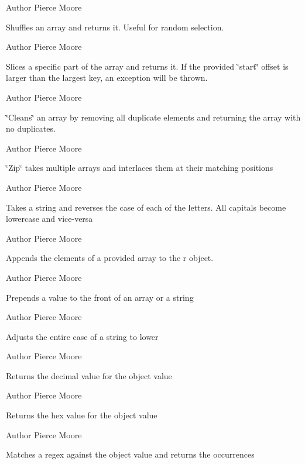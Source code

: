 \begin{DoxyAuthor}{Author}
Pierce Moore
\end{DoxyAuthor}
Shuffles an array and returns it. Useful for random selection.

\begin{DoxyAuthor}{Author}
Pierce Moore
\end{DoxyAuthor}
Slices a specific part of the array and returns it. If the provided \char`\"{}start\char`\"{} offset is larger than the largest key, an exception will be thrown.

\begin{DoxyAuthor}{Author}
Pierce Moore
\end{DoxyAuthor}
\char`\"{}\-Cleans\char`\"{} an array by removing all duplicate elements and returning the array with no duplicates.

\begin{DoxyAuthor}{Author}
Pierce Moore
\end{DoxyAuthor}
\char`\"{}\-Zip\char`\"{} takes multiple arrays and interlaces them at their matching positions

\begin{DoxyAuthor}{Author}
Pierce Moore
\end{DoxyAuthor}
Takes a string and reverses the case of each of the letters. All capitals become lowercase and vice-\/versa

\begin{DoxyAuthor}{Author}
Pierce Moore
\end{DoxyAuthor}
Appends the elements of a provided array to the r object.

\begin{DoxyAuthor}{Author}
Pierce Moore
\end{DoxyAuthor}
Prepends a value to the front of an array or a string

\begin{DoxyAuthor}{Author}
Pierce Moore
\end{DoxyAuthor}
Adjusts the entire case of a string to lower

\begin{DoxyAuthor}{Author}
Pierce Moore
\end{DoxyAuthor}
Returns the decimal value for the object value

\begin{DoxyAuthor}{Author}
Pierce Moore
\end{DoxyAuthor}
Returns the hex value for the object value

\begin{DoxyAuthor}{Author}
Pierce Moore
\end{DoxyAuthor}
Matches a regex against the object value and returns the occurrences

